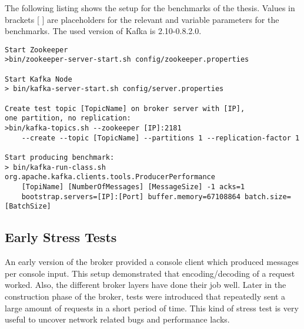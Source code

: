 The following listing shows the setup for the benchmarks of the thesis. Values
in brackets [ ] are placeholders for the relevant and variable parameters for the
benchmarks. The used version of Kafka is 2.10-0.8.2.0. 

\begin{verbatim}
Start Zookeeper
>bin/zookeeper-server-start.sh config/zookeeper.properties

Start Kafka Node 
> bin/kafka-server-start.sh config/server.properties

Create test topic [TopicName] on broker server with [IP], 
one partition, no replication: 
>bin/kafka-topics.sh --zookeeper [IP]:2181 
    --create --topic [TopicName] --partitions 1 --replication-factor 1

Start producing benchmark: 
> bin/kafka-run-class.sh org.apache.kafka.clients.tools.ProducerPerformance 
    [TopiName] [NumberOfMessages] [MessageSize] -1 acks=1 
    bootstrap.servers=[IP]:[Port] buffer.memory=67108864 batch.size=[BatchSize]
\end{verbatim}





\newpage
\subsection{Early Stress Tests}

An early version of the broker provided a console client which produced messages
per console input. This setup demonstrated that encoding/decoding of a request
worked. Also, the different broker layers have done their job well.  Later in the
construction phase of the broker, tests were introduced that repeatedly sent a large amount of
requests in a short period of time. This kind of stress test is
very useful to uncover network related bugs and performance lacks. 

